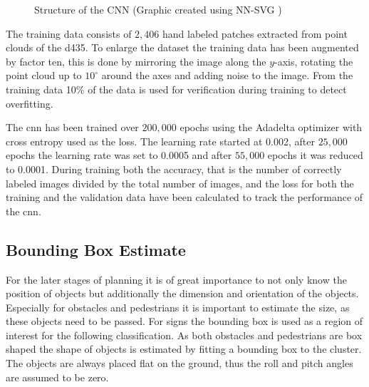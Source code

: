 \begin{figure}[h!]
    \centering
    \caption{Structure of the CNN (Graphic created using NN-SVG \cite{LeNail2019NN})}
    \label{fig:det:cnnStructure}
\end{figure}

The training data consists of $2,406$ hand labeled patches extracted from point clouds of the \ac{d435}. To enlarge the dataset the training data has been augmented by factor ten, this is done by mirroring the image along the $y$-axis, rotating the point cloud up to $10^\circ$ around the axes and adding noise to the image. From the training data 10\% of the data is used for verification during training to detect overfitting.

The \ac{cnn} has been trained over $200,000$ epochs using the Adadelta optimizer with cross entropy used as the loss. The learning rate started at 0.002, after $25,000$ epochs the learning rate was set to 0.0005 and after $55,000$ epochs it was reduced to 0.0001. During training both the accuracy, that is the number of correctly labeled images divided by the total number of images, and the loss for both the training and the validation data have been calculated to track the performance of the
\ac{cnn}.

\subsection{Bounding Box Estimate} \label{sec:det:bbe}
For the later stages of planning it is of great importance to not only know the position of objects but additionally the dimension and orientation of the objects. 
Especially for obstacles and pedestrians it is important to estimate the size, as these objects need to be passed.
For signs the bounding box is used as a region of interest for the following classification.
As both obstacles and pedestrians are box shaped the shape of objects is estimated by fitting a bounding box to the cluster.
The objects are always placed flat on the ground, thus the roll and pitch angles are assumed to be zero. 


